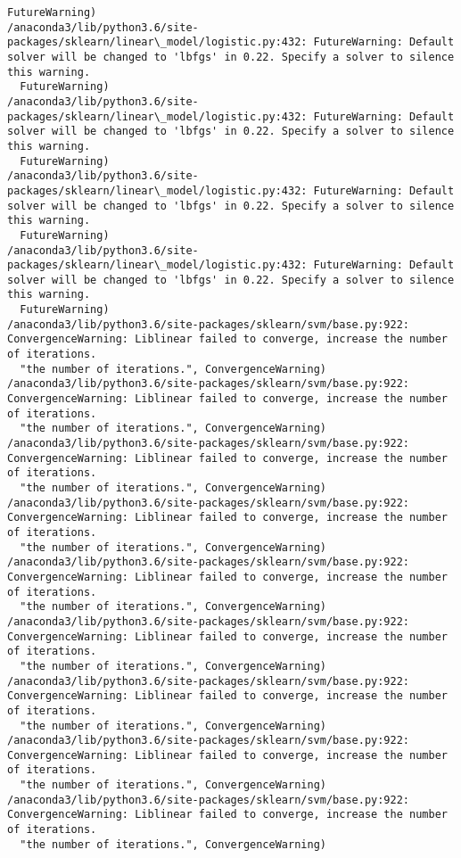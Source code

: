 \documentclass[11pt]{article}
\begin{document}
\begin{Verbatim}[commandchars=\\\{\}]
  FutureWarning)
/anaconda3/lib/python3.6/site-packages/sklearn/linear\_model/logistic.py:432: FutureWarning: Default solver will be changed to 'lbfgs' in 0.22. Specify a solver to silence this warning.
  FutureWarning)
/anaconda3/lib/python3.6/site-packages/sklearn/linear\_model/logistic.py:432: FutureWarning: Default solver will be changed to 'lbfgs' in 0.22. Specify a solver to silence this warning.
  FutureWarning)
/anaconda3/lib/python3.6/site-packages/sklearn/linear\_model/logistic.py:432: FutureWarning: Default solver will be changed to 'lbfgs' in 0.22. Specify a solver to silence this warning.
  FutureWarning)
/anaconda3/lib/python3.6/site-packages/sklearn/linear\_model/logistic.py:432: FutureWarning: Default solver will be changed to 'lbfgs' in 0.22. Specify a solver to silence this warning.
  FutureWarning)
/anaconda3/lib/python3.6/site-packages/sklearn/svm/base.py:922: ConvergenceWarning: Liblinear failed to converge, increase the number of iterations.
  "the number of iterations.", ConvergenceWarning)
/anaconda3/lib/python3.6/site-packages/sklearn/svm/base.py:922: ConvergenceWarning: Liblinear failed to converge, increase the number of iterations.
  "the number of iterations.", ConvergenceWarning)
/anaconda3/lib/python3.6/site-packages/sklearn/svm/base.py:922: ConvergenceWarning: Liblinear failed to converge, increase the number of iterations.
  "the number of iterations.", ConvergenceWarning)
/anaconda3/lib/python3.6/site-packages/sklearn/svm/base.py:922: ConvergenceWarning: Liblinear failed to converge, increase the number of iterations.
  "the number of iterations.", ConvergenceWarning)
/anaconda3/lib/python3.6/site-packages/sklearn/svm/base.py:922: ConvergenceWarning: Liblinear failed to converge, increase the number of iterations.
  "the number of iterations.", ConvergenceWarning)
/anaconda3/lib/python3.6/site-packages/sklearn/svm/base.py:922: ConvergenceWarning: Liblinear failed to converge, increase the number of iterations.
  "the number of iterations.", ConvergenceWarning)
/anaconda3/lib/python3.6/site-packages/sklearn/svm/base.py:922: ConvergenceWarning: Liblinear failed to converge, increase the number of iterations.
  "the number of iterations.", ConvergenceWarning)
/anaconda3/lib/python3.6/site-packages/sklearn/svm/base.py:922: ConvergenceWarning: Liblinear failed to converge, increase the number of iterations.
  "the number of iterations.", ConvergenceWarning)
/anaconda3/lib/python3.6/site-packages/sklearn/svm/base.py:922: ConvergenceWarning: Liblinear failed to converge, increase the number of iterations.
  "the number of iterations.", ConvergenceWarning)

\end{Verbatim}
\end{document}
